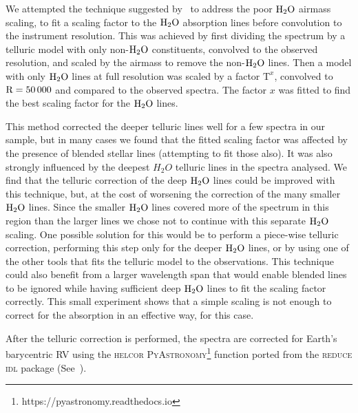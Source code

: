\documentclass[fleqn,usenatbib]{mnras}
\begin{document}
We attempted the technique suggested by~\citet{bertaux_tapas_2014} to address the poor \(\rm H_{2}O\) airmass scaling, to fit a scaling factor to the \(\rm {H}_{2}O\) absorption lines before convolution to the instrument resolution. This was achieved by first dividing the spectrum by a telluric model with only non-\(\rm H_{2}O\) constituents, convolved to the observed resolution, and scaled by the airmass to remove the non-\(\rm H_{2}O\) lines. Then a model with only \(\rm H_{2}O\) lines at full resolution was scaled by a factor \(\textrm{T}^{x}\), convolved to \(\rm R=50\,000\) and compared to the observed spectra. The factor \(x\) was fitted to find the best scaling factor for the \(\rm H_{2}O\) lines.

This method corrected the deeper telluric lines well for a few spectra in our sample, but in many cases we found that the fitted scaling factor was affected by the presence of blended stellar lines (attempting to fit those also). It was also strongly influenced by the deepest \(H_{2}O\) telluric lines in the spectra analysed. We find that the telluric correction of the deep \(\rm H_{2}O\) lines could be improved with this technique, but, at the cost of worsening the correction of the many smaller \(\rm H_{2}O\) lines. Since the smaller \(\rm H_{2}O\) lines covered more of the spectrum in this region than the larger lines we chose not to continue with this separate \(\rm H_{2}O\) scaling. One possible solution for this would be to perform a piece-wise telluric correction, performing this step only for the deeper \( \rm H_{2}O\) lines, or by using one of the other tools that fits the telluric model to the observations. This technique could also benefit from a larger wavelength span that would enable blended lines to be ignored while having sufficient deep \(\rm H_{2}O\) lines to fit the scaling factor correctly. This small experiment shows that a simple scaling is not enough to correct for the absorption in an effective way, for this case.

After the telluric correction is performed, the spectra are corrected for Earth's barycentric RV using the \textsc{helcor} \textsc{PyAstronomy}\footnote{https://pyastronomy.readthedocs.io} function ported from the \textsc{reduce idl} package (See~\citet[][]{piskunov_new_2002}).
\end{document}
